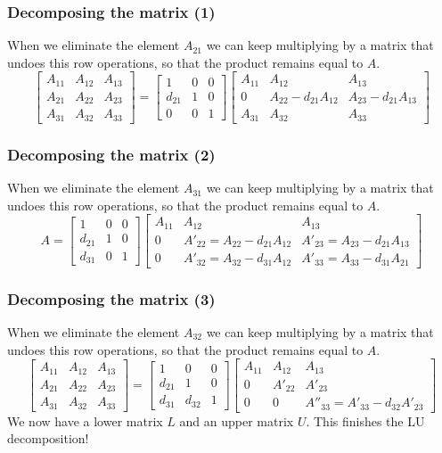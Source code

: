 \begin{frame}[fragile]
  \frametitle{Decomposing the matrix (1)}
  When we eliminate the element $A_{21}$ we can keep multiplying by a matrix that undoes this row operations, so that the product remains equal to $A$.
\[ 
\begin{bmatrix}
A_{11} & A_{12} & A_{13}\\ 
A_{21} & A_{22} & A_{23}\\ 
A_{31} & A_{32} & A_{33}
\end{bmatrix} = 
\begin{bmatrix}
1 & 0 & 0 \\
d_{21}& 1 & 0 \\
0 & 0 & 1
\end{bmatrix}
\begin{bmatrix}
A_{11} & A_{12} & A_{13}\\ 
0 & A_{22}-d_{21}A_{12} & A_{23}-d_{21}A_{13}\\ 
A_{31} & A_{32} & A_{33}
\end{bmatrix}
\]
\end{frame}

\begin{frame}[fragile]
  \frametitle{Decomposing the matrix (2)}
  When we eliminate the element $A_{31}$ we can keep multiplying by a matrix that undoes this row operations, so that the product remains equal to $A$.
\[ 
A = 
\begin{bmatrix}
1 & 0 & 0 \\
d_{21}& 1 & 0 \\
d_{31} & 0 & 1
\end{bmatrix}
\begin{bmatrix}
A_{11} & A_{12} & A_{13}\\ 
0 & A'_{22}=A_{22}-d_{21}A_{12} & A'_{23} = A_{23}-d_{21}A_{13}\\ 
0 & A'_{32} = A_{32}-d_{31}A_{12} & A'_{33} = A_{33}-d_{31}A_{21}
\end{bmatrix}
\]
\end{frame}

\begin{frame}[fragile]
  \frametitle{Decomposing the matrix (3)}
  When we eliminate the element $A_{32}$ we can keep multiplying by a matrix that undoes this row operations, so that the product remains equal to $A$.
\[ 
\begin{bmatrix}
A_{11} & A_{12} & A_{13}\\ 
A_{21} & A_{22} & A_{23}\\ 
A_{31} & A_{32} & A_{33}
\end{bmatrix} = 
\begin{bmatrix}
1 & 0 & 0 \\
d_{21}& 1 & 0 \\
d_{31} & d_{32} & 1
\end{bmatrix}
\begin{bmatrix}
A_{11} & A_{12} & A_{13}\\ 
0 & A'_{22} & A'_{23} \\ 
0 & 0  & A''_{33} = A'_{33}-d_{32}A'_{23}
\end{bmatrix}
\]\pause
We now have a lower matrix $L$ and an upper matrix $U$. This finishes the LU decomposition! 
\end{frame}

